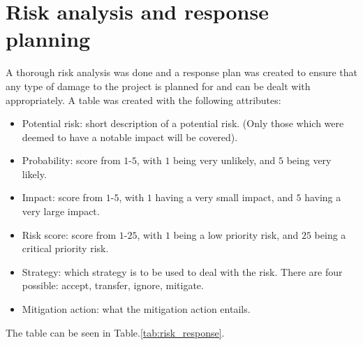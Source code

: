 \newpage
\section{Risk analysis and response planning}
\label{section:risk_analysis_and_response_planning}

A thorough risk analysis was done and a response plan was created to ensure that any type of damage to the project is planned for and can be dealt with appropriately.
A table was created with the following attributes:
\begin{itemize}
    \item Potential risk: short description of a potential risk. (Only those which were deemed to have a notable impact will be covered).
    \item Probability: score from $1\text{-}5$, with $1$ being very unlikely, and $5$ being very likely.
    \item Impact: score from $1\text{-}5$, with $1$ having a very small impact, and $5$ having a very large impact.
    \item Risk score: score from $1\text{-}25$, with $1$ being a low priority risk, and $25$ being a critical priority risk.
    \item Strategy: which strategy is to be used to deal with the risk. There are four possible: accept, transfer, ignore, mitigate.
    \item Mitigation action: what the mitigation action entails.
\end{itemize}
The table can be seen in Table.\:\ref{tab:risk_response}.

\begin{table}
    \centering
    \caption{The risks, their probability, impact, risk score and the planned responses.}
    \label{tab:risk_response}
\end{table}

